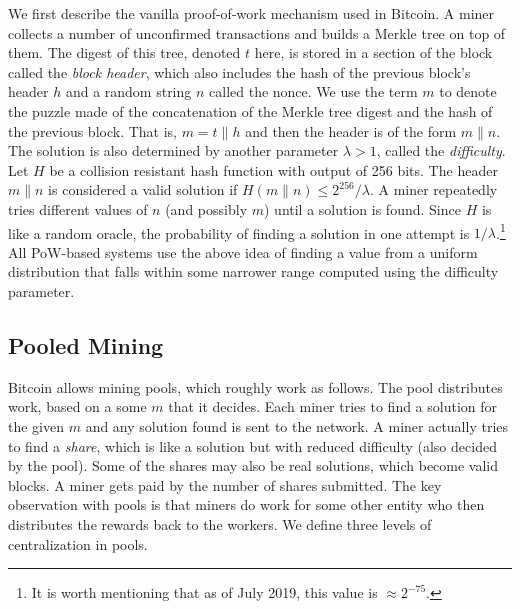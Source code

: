 \documentclass[11pt]{article}
\begin{document}
We first describe the vanilla proof-of-work mechanism used in Bitcoin. A miner collects a number of unconfirmed transactions and builds a Merkle tree on top of them.
The digest of this tree, denoted $t$ here, is stored in a section of the block called the {\em block header}, which also includes the hash of the previous block's header $h$ and a random string $n$ called the nonce. We use the term $m$ to denote the puzzle made of the concatenation of the Merkle tree digest and the hash of the previous block. That is, $m = t\|h$ and
then the header is of the form $m\|n$.
The solution is also determined by another parameter $\lambda > 1$, called the {\em difficulty}. Let $H$ be a collision
resistant hash function with output of 256 bits. 
The header $m\|n$ is considered a valid solution
if $H(m\|n) \leq 2^{256}/\lambda$.
A miner repeatedly tries different values of $n$ (and possibly $m$) until a solution is found. 
Since $H$ is like a random oracle, the probability of finding a solution in one attempt is 
$1 / \lambda$.\footnote{It is worth mentioning that as of July 2019, this value is $\approx 2^{-75}$.} %
All PoW-based systems use the above idea of finding a value from a uniform distribution that falls within some narrower range computed using the difficulty parameter. 

\subsection{Pooled Mining} 

Bitcoin allows mining pools, which roughly work as follows. The pool distributes work, based on a some $m$ that it decides. Each miner tries to find a solution for the given $m$ and any solution found is sent to the network.
A miner actually tries to find a {\em share}, which is like a solution but with reduced difficulty (also decided by the pool). Some of the shares may also be real solutions, which become valid blocks. A miner gets paid by the number of shares submitted.
The key observation with pools is that miners do work for some other entity who then distributes the rewards back to the workers.
We define three levels of centralization in pools.
\end{document}
